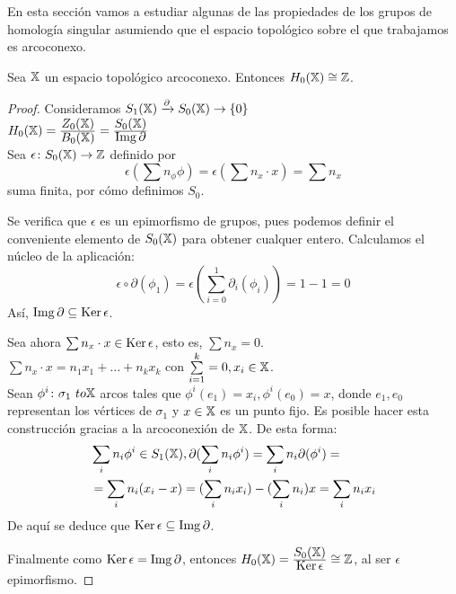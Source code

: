 En esta sección vamos a estudiar algunas de las propiedades de los grupos de homología singular asumiendo que el espacio topológico
sobre el que trabajamos es arcoconexo.

\begin{proposition}
  Sea ${\mathbb X}$ un espacio topológico arcoconexo. Entonces $H_0({\mathbb X}) \cong \mathbb Z$.
\end{proposition}

\begin{proof}
  Consideramos $S_{1}({\mathbb X}) \xrightarrow{\partial} S_{0}({\mathbb X}) \to \{0\}$ \\
  $H_0({\mathbb X}) = \frac{\displaystyle Z_0({\mathbb X})}{\displaystyle B_0({\mathbb X})} = \frac{\displaystyle S_0({\mathbb X})}{\displaystyle \operatorname{Img} \partial}$ \\
  Sea $\epsilon \colon S_0({\mathbb X}) \to \mathbb{Z}$ definido por \[\epsilon(\sum n_\phi \phi) = \epsilon(\sum n_x \cdot x) = \sum n_x \]
  suma finita, por cómo definimos $S_0$.

  Se verifica que $\epsilon$ es un epimorfismo de grupos, pues podemos definir el conveniente elemento de $S_0({\mathbb X})$ para obtener
  cualquer entero. Calculamos el núcleo de la aplicación:
  \[ \epsilon \circ \partial(\phi_1) = \epsilon(\sum_{i=0}^1 \partial_i(\phi_i)) = 1 - 1 = 0\]  Así, $\operatorname{Img} \partial \subseteq \operatorname{Ker} \epsilon$.

  Sea ahora $\sum n_x \cdot x \in \operatorname{Ker} \epsilon$, esto es, $\sum n_x = 0$. \\
  $\sum n_x \cdot x = n_1 x_1 + \dots + n_k x_k$ con $\sum\limits_{i=1}^k = 0, x_i \in {\mathbb X}$. \\
  Sean $\phi^i \colon \sigma_1 \ to {\mathbb X}$ arcos tales que $\phi^i(e_1) = x_i, \phi^i(e_0) = x$,
  donde $e_1, e_0$ representan los vértices de $\sigma_1$ y $x \in {\mathbb X}$ es un punto fijo.
  Es posible hacer esta construcción gracias a la arcoconexión de ${\mathbb X}$. De esta forma:
  \begin{align*}
    &\sum_i n_i \phi^i \in S_{1}({\mathbb X}), \partial(\sum_i n_i \phi^i) = \sum_i n_i \partial(\phi^i) =\\
    &= \sum_i n_i(x_i - x) = (\sum_i n_i x_i) - (\sum_i n_i) x = \sum_i n_i x_i
  \end{align*}
  De aquí se deduce que $\operatorname{Ker} \epsilon \subseteq \operatorname{Img} \partial$.

  Finalmente como $\operatorname{Ker} \epsilon = \operatorname{Img} \partial$, entonces $H_0({\mathbb X}) = \frac{\displaystyle S_0({\mathbb X})}{\displaystyle \operatorname{Ker} \epsilon} \cong \mathbb{Z}$, al ser $\epsilon$ epimorfismo.
\end{proof}

